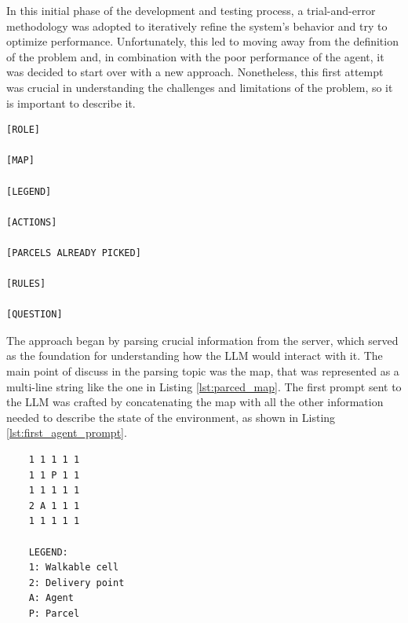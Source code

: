 In this initial phase of the development and testing process, a trial-and-error
methodology was adopted to iteratively refine the system's behavior and try to
optimize performance. Unfortunately, this led to moving away from the definition
of the problem and, in combination with the poor performance of the agent, it
was decided to start over with a new approach. Nonetheless, this first attempt
was crucial in understanding the challenges and limitations of the problem, so it
is important to describe it.

\vspace{1mm}
\begin{codewindow}
  [Text]  \begin{lstlisting}
[ROLE]

[MAP]

[LEGEND]

[ACTIONS]

[PARCELS ALREADY PICKED]

[RULES]

[QUESTION]
\end{lstlisting}
\end{codewindow}
\vspace{1mm}

The approach began by parsing crucial information from the server, which served as
the foundation for understanding how the LLM would interact with it. The main
point of discuss in the parsing topic was the map, that was represented as a multi-line
string like the one in Listing \ref{lst:parced_map}. The first prompt sent to
the LLM was crafted by concatenating the map with all the other information
needed to describe the state of the environment, as shown in Listing \ref{lst:first_agent_prompt}.

\vspace{1mm}
\begin{codewindow}
  [Text]  \begin{lstlisting}
    1 1 1 1 1
    1 1 P 1 1
    1 1 1 1 1
    2 A 1 1 1
    1 1 1 1 1

    LEGEND:
    1: Walkable cell
    2: Delivery point
    A: Agent
    P: Parcel
\end{lstlisting}
\end{codewindow}
\vspace{1mm}

